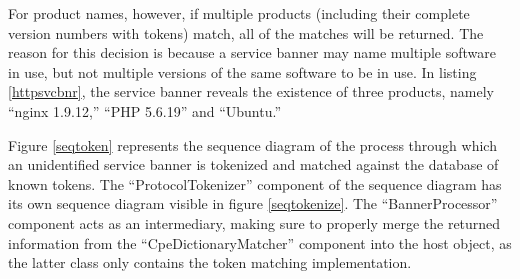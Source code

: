 \documentclass[a4paper,12pt]{article}
\begin{document}
	For product names, however, if multiple products (including their complete version numbers with tokens) match, all of the matches will be returned. The reason for this decision is because a service banner may name multiple software in use, but not multiple versions of the same software to be in use. In listing \ref{httpsvcbnr}, the service banner reveals the existence of three products, namely ``nginx 1.9.12,'' ``PHP 5.6.19'' and ``Ubuntu.''
	
	Figure \ref{seqtoken} represents the sequence diagram of the process through which an unidentified service banner is tokenized and matched against the database of known tokens. The ``ProtocolTokenizer'' component of the sequence diagram has its own sequence diagram visible in figure \ref{seqtokenize}. The ``BannerProcessor'' component acts as an intermediary, making sure to properly merge the returned information from the ``CpeDictionaryMatcher'' component into the host object, as the latter class only contains the token matching implementation.
	
\end{document}
